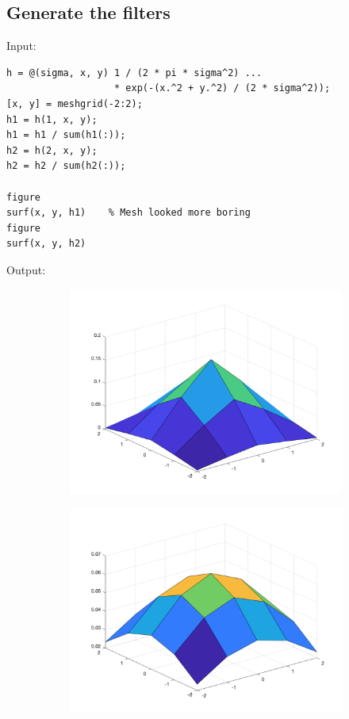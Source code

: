 \documentclass[12pt, a4paper]{article}
\begin{document}
\subsection{Generate the filters}
Input:
\begin{verbatim}
h = @(sigma, x, y) 1 / (2 * pi * sigma^2) ...
                   * exp(-(x.^2 + y.^2) / (2 * sigma^2));
[x, y] = meshgrid(-2:2);
h1 = h(1, x, y);
h1 = h1 / sum(h1(:));
h2 = h(2, x, y);
h2 = h2 / sum(h2(:));

figure
surf(x, y, h1)    % Mesh looked more boring
figure
surf(x, y, h2)
\end{verbatim}
Output:
\begin{figure}[H]
    \centering %
    \begin{subfigure}[b]{0.45\textwidth}
        \includegraphics[width=\textwidth]{fig9.png}
    \end{subfigure}
    \begin{subfigure}[b]{0.45\textwidth}
        \includegraphics[width=\textwidth]{fig10.png}
    \end{subfigure}
\end{figure}
\end{document}
